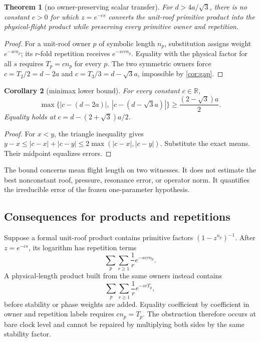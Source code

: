 \documentclass[11pt,a4paper]{article}
\newtheorem{theorem}{Theorem}[section]
\newtheorem{corollary}[theorem]{Corollary}
\theoremstyle{definition}
\theoremstyle{remark}
\begin{document}
\begin{theorem}[no owner-preserving scalar transfer]\label{thm:nontransfer}
For \(d>4a/\sqrt3\), there is no constant \(c>0\) for which \(z=e^{-cs}\)
converts the unit-roof primitive product into the physical-flight product
while preserving every primitive owner and repetition.
\end{theorem}
\begin{proof}
For a unit-roof owner \(p\) of symbolic length \(n_p\), substitution assigns weight \(e^{-scn_p}\); its \(r\)-fold repetition receives \(e^{-scrn_p}\). Equality with the physical factor for all \(s\) requires \(T_p=cn_p\) for every \(p\). The two symmetric owners force \(c=T_2/2=d-2a\) and \(c=T_3/3=d-\sqrt3a\), impossible by \cref{cor:gap}.
\end{proof}

\begin{corollary}[minimax lower bound]\label{cor:minimax}
For every constant \(c\in\mathbb R\),
\[
 \max\{|c-(d-2a)|,\ |c-(d-\sqrt3a)|\}
 \ge \frac{(2-\sqrt3)a}{2}.
\]
Equality holds at \(c=d-(2+\sqrt3)a/2\).
\end{corollary}
\begin{proof}
For \(x<y\), the triangle inequality gives
\(y-x\le|c-x|+|c-y|\le2\max(|c-x|,|c-y|)\). Substitute the exact means. Their midpoint equalizes errors.
\end{proof}

The bound concerns mean flight length on two witnesses. It does not estimate the best nonconstant roof, pressure, resonance error, or operator norm. It quantifies the irreducible error of the frozen one-parameter hypothesis.

\subsection{Consequences for products and repetitions}

Suppose a formal unit-roof product contains primitive factors \((1-z^{n_p})^{-1}\). After \(z=e^{-cs}\), its logarithm has repetition terms
\[
 \sum_p\sum_{r\ge1}\frac{1}{r}e^{-scrn_p}.
\]
A physical-length product built from the same owners instead contains
\[
 \sum_p\sum_{r\ge1}\frac{1}{r}e^{-srT_p},
\]
before stability or phase weights are added. Equality coefficient by coefficient in owner and repetition labels requires \(cn_p=T_p\). The obstruction therefore occurs at bare clock level and cannot be repaired by multiplying both sides by the same stability factor.
\end{document}
